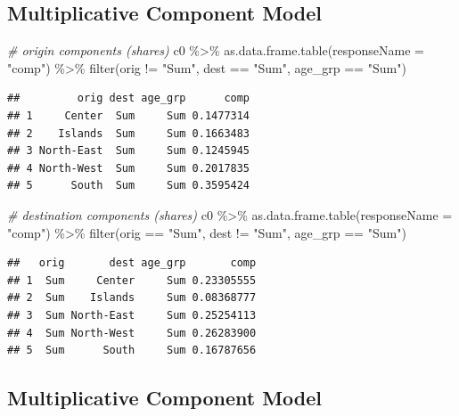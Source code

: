 \documentclass[
]{book}
\newenvironment{Shaded}{\begin{snugshade}}{\end{snugshade}}
\newcommand{\AttributeTok}[1]{\textcolor[rgb]{0.77,0.63,0.00}{#1}}
\newcommand{\CommentTok}[1]{\textcolor[rgb]{0.56,0.35,0.01}{\textit{#1}}}
\newcommand{\FunctionTok}[1]{\textcolor[rgb]{0.00,0.00,0.00}{#1}}
\newcommand{\NormalTok}[1]{#1}
\newcommand{\SpecialCharTok}[1]{\textcolor[rgb]{0.00,0.00,0.00}{#1}}
\newcommand{\StringTok}[1]{\textcolor[rgb]{0.31,0.60,0.02}{#1}}
\begin{document}
\hypertarget{multiplicative-component-model-10}{%
\subsection{Multiplicative Component Model}\label{multiplicative-component-model-10}}

\begin{Shaded}
\begin{Highlighting}[]
\CommentTok{\# origin components (shares)}
\NormalTok{c0 }\SpecialCharTok{\%\textgreater{}\%}
  \FunctionTok{as.data.frame.table}\NormalTok{(}\AttributeTok{responseName =} \StringTok{"comp"}\NormalTok{) }\SpecialCharTok{\%\textgreater{}\%}
  \FunctionTok{filter}\NormalTok{(orig }\SpecialCharTok{!=} \StringTok{"Sum"}\NormalTok{, dest }\SpecialCharTok{==} \StringTok{"Sum"}\NormalTok{, age\_grp }\SpecialCharTok{==} \StringTok{"Sum"}\NormalTok{)}
\end{Highlighting}
\end{Shaded}

\begin{verbatim}
##         orig dest age_grp      comp
## 1     Center  Sum     Sum 0.1477314
## 2    Islands  Sum     Sum 0.1663483
## 3 North-East  Sum     Sum 0.1245945
## 4 North-West  Sum     Sum 0.2017835
## 5      South  Sum     Sum 0.3595424
\end{verbatim}

\begin{Shaded}
\begin{Highlighting}[]
\CommentTok{\# destination components (shares)}
\NormalTok{c0 }\SpecialCharTok{\%\textgreater{}\%}
  \FunctionTok{as.data.frame.table}\NormalTok{(}\AttributeTok{responseName =} \StringTok{"comp"}\NormalTok{) }\SpecialCharTok{\%\textgreater{}\%}
  \FunctionTok{filter}\NormalTok{(orig }\SpecialCharTok{==} \StringTok{"Sum"}\NormalTok{, dest }\SpecialCharTok{!=} \StringTok{"Sum"}\NormalTok{, age\_grp }\SpecialCharTok{==} \StringTok{"Sum"}\NormalTok{)}
\end{Highlighting}
\end{Shaded}

\begin{verbatim}
##   orig       dest age_grp       comp
## 1  Sum     Center     Sum 0.23305555
## 2  Sum    Islands     Sum 0.08368777
## 3  Sum North-East     Sum 0.25254113
## 4  Sum North-West     Sum 0.26283900
## 5  Sum      South     Sum 0.16787656
\end{verbatim}

\hypertarget{multiplicative-component-model-11}{%
\subsection{Multiplicative Component Model}\label{multiplicative-component-model-11}}
\end{document}
